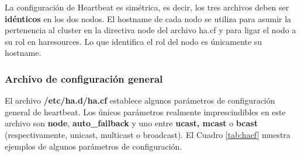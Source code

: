La configuración de Heartbeat es simétrica, es decir, los tres archivos deben ser \textbf{idénticos} en los dos nodos. El hostname de cada nodo se utiliza para asumir la pertenencia al cluster en la directiva node del archivo ha.cf y para ligar el nodo a su rol en haresources. Lo que identifica el rol del nodo es únicamente su hostname. 

\subsubsection{Archivo de configuración general}
El archivo \textbf{/etc/ha.d/ha.cf} establece algunos parámetros de configuración general de heartbeat. Los únicos parámetros realmente imprescindibles en este archivo son \textbf{node}, \textbf{auto\_failback} y uno entre \textbf{ucast, mcast} o \textbf{bcast} (respectivamente, unicast, multicast o broadcast). El Cuadro \ref{tab:hacf} muestra ejemplos de algunos parámetros de configuración. 



